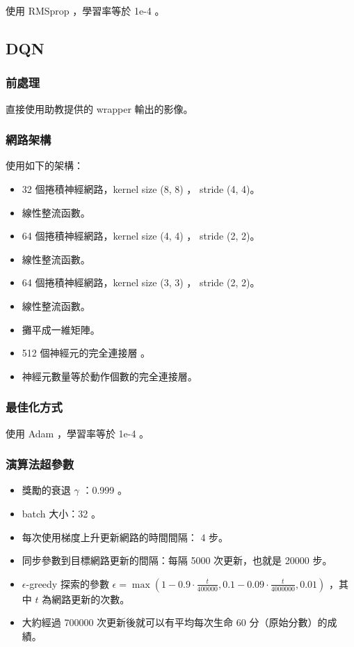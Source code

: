 \documentclass[fleqn,a4paper,12pt]{article}
\begin{document}
使用 RMSprop ，學習率等於 1e-4 。

\subsection{DQN}

\subsubsection*{前處理}

直接使用助教提供的 wrapper 輸出的影像。

\subsubsection*{網路架構}

使用如下的架構：

\begin{itemize}
\item 32 個捲積神經網路，kernel size (8, 8) ， stride (4, 4)。
\item 線性整流函數。
\item 64 個捲積神經網路，kernel size (4, 4) ， stride (2, 2)。
\item 線性整流函數。
\item 64 個捲積神經網路，kernel size (3, 3) ， stride (2, 2)。
\item 線性整流函數。
\item 攤平成一維矩陣。
\item 512 個神經元的完全連接層 。
\item 神經元數量等於動作個數的完全連接層。
\end{itemize}

\subsubsection*{最佳化方式}

使用 Adam ，學習率等於 1e-4 。

\subsubsection*{演算法超參數}

\begin{itemize}
\item 獎勵的衰退 $\gamma$ ：0.999 。
\item batch 大小：32 。
\item 每次使用梯度上升更新網路的時間間隔： 4 步。
\item 同步參數到目標網路更新的間隔：每隔 5000 次更新，也就是 20000 步。
\item $\epsilon$-greedy 探索的參數 $\epsilon = \max(1 -  0.9 \cdot \frac{t}{400000}, 0.1 - 0.09 \cdot \frac{t}{4000000}, 0.01)$ ，其中 $t$ 為網路更新的次數。
\item 大約經過 700000 次更新後就可以有平均每次生命 60 分（原始分數）的成績。
\end{itemize}
\end{document}
